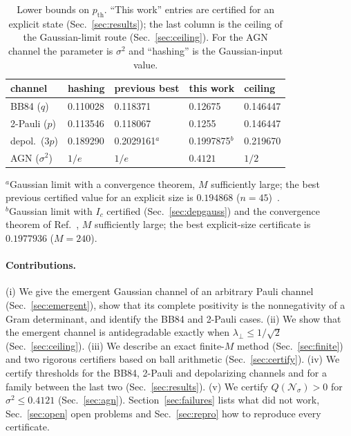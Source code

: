\documentclass[aps,pra,reprint,superscriptaddress,nofootinbib,longbibliography,floatfix]{revtex4-2}
\theoremstyle{remark}
\newcommand{\Ic}{I_c}
\newcommand{\lperp}{\lambda_\perp}
\newcommand{\Nsig}{\mathcal{N}_\sigma}
\begin{document}
\begin{table}[t]
\caption{Lower bounds on $p_{\mathrm{th}}$. ``This work'' entries are certified for an explicit state
(Sec.~\ref{sec:results}); the last column is the ceiling of the Gaussian-limit route
(Sec.~\ref{sec:ceiling}). For the AGN channel the parameter is $\sigma^2$ and ``hashing'' is the
Gaussian-input value.}
\label{tab:overview}
\begin{ruledtabular}
\begin{tabular}{lllll}
channel & hashing & previous best & this work & ceiling\\
\hline
BB84 ($q$) & 0.110028 & 0.118371~\cite{agarwal2026symmetry} & 0.12675 & 0.146447\\
2-Pauli ($p$) & 0.113546 & 0.118067~\cite{agarwal2026symmetry} & 0.1255 & 0.146447\\
depol.\ ($3p$) & 0.189290 & 0.2029161$^{a}$~\cite{ahmed2026choir} & 0.1997875$^{b}$ & 0.219670\\
AGN ($\sigma^2$) & $1/e$ & $1/e$~\cite{holevo2001evaluating} & $0.4121$ & $1/2$\\
\end{tabular}
\end{ruledtabular}
\raggedright\footnotesize
$^{a}$Gaussian limit with a convergence theorem, $M$ sufficiently large; the best previous certified
value for an explicit size is $0.194868$ ($n=45$)~\cite{krohn2026certified}.\\
$^{b}$Gaussian limit with $\Ic$ certified (Sec.~\ref{sec:depgauss}) and the convergence theorem of
Ref.~\cite{ahmed2026choir}, $M$ sufficiently large; the best explicit-size certificate is $0.1977936$
($M=240$).
\end{table}

\paragraph*{Contributions.}
(i) We give the emergent Gaussian channel of an arbitrary Pauli channel (Sec.~\ref{sec:emergent}), show
that its complete positivity is the nonnegativity of a Gram determinant, and identify the BB84 and
2-Pauli cases. (ii) We show that the emergent channel is antidegradable exactly when
$\lperp\le1/\sqrt2$ (Sec.~\ref{sec:ceiling}). (iii) We describe an exact finite-$M$ method
(Sec.~\ref{sec:finite}) and two rigorous certifiers based on ball arithmetic (Sec.~\ref{sec:certify}).
(iv) We certify thresholds for the BB84, 2-Pauli and depolarizing channels and for a family between the
last two (Sec.~\ref{sec:results}). (v) We certify $Q(\Nsig)>0$ for $\sigma^2\le0.4121$
(Sec.~\ref{sec:agn}). Section~\ref{sec:failures} lists what did not work, Sec.~\ref{sec:open} open
problems and Sec.~\ref{sec:repro} how to reproduce every certificate.
\end{document}
